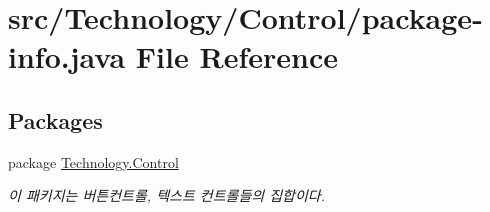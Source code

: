 \hypertarget{_technology_2_control_2package-info_8java}{\section{src/\-Technology/\-Control/package-\/info.java File Reference}
\label{_technology_2_control_2package-info_8java}
}
\subsection*{Packages}
\begin{DoxyCompactItemize}
\item 
package \hyperlink{namespace_technology_1_1_control}{Technology.\-Control}
\begin{DoxyCompactList}\small\item\em 이 패키지는 버튼컨트롤, 텍스트 컨트롤들의 집합이다. \end{DoxyCompactList}\end{DoxyCompactItemize}
